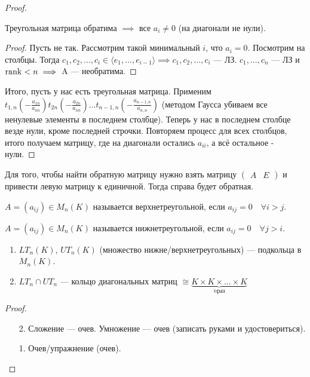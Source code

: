 \begin{proof}
    \begin{statement}
        Треугольная матрица обратима $\implies$ все  $a_i \neq 0$ (на диагонали не нули).
    \end{statement}
    \begin{proof}
        Пусть не так. Рассмотрим такой минимальный $i$, что  $a_i = 0$. Посмотрим на столбцы. Тогда  $c_1, c_2, \ldots, c_i \in \langle e_1, \ldots, e_{i-1} \rangle \implies c_1, c_2, \ldots, c_i$ --- ЛЗ. $c_1,\ldots,c_n$ --- ЛЗ и $\operatorname{rank} < n \implies$ A --- необратима.
    \end{proof}
    Итого, пусть у нас есть треугольная матрица. Применим $t_{1, n}(-\frac{a_{1n}}{a_{nn}})t_{2n}(-\frac{a_{2n}}{a_{nn}})\ldots t_{n-1,n}(-\frac{a_{n-1,n}}{a_{n,n}})$ (методом Гаусса убиваем все ненулевые элементы в последнем столбце). Теперь у нас в последнем столбце везде нули, кроме последней строчки. Повторяем процесс для всех столбцов, итого получаем матрицу, где на диагонали остались $a_{ii}$, а всё остальное - нули.
\end{proof}
\begin{statement}
    Для того, чтобы найти обратную матрицу нужно взять матрицу $\left(\begin{array}{c|c} A & E \end{array}\right)$ и привести левую матрицу к единичной. Тогда справа будет обратная.
\end{statement}
\begin{definition}
    $A = (a_{ij}) \in M_n(K)$ называется верхнетреугольной, если  $a_{ij} = 0 \quad \forall i > j$.

     $A = (a_{ij}) \in M_n(K)$ называется нижнетреугольной, если  $a_{ij} = 0 \quad \forall j > i$.
\end{definition}
\begin{statement}
    \begin{enumerate}
        \item $LT_n(K)$,  $UT_n(K)$ (множество нижне/верхнетреугольных) --- подкольца в  $M_n(K)$.
        \item $LT_n \cap UT_n$ --- кольцо диагональных матриц  $\cong \underbrace{K \times K \times \ldots \times K}_{n \text{раз}}$
    \end{enumerate}
\end{statement}
\begin{proof}
    \slashn
    \begin{enumerate}
        \item[2.] Сложение --- очев. Умножение --- очев (записать руками и удостовериться).
        \item [1.] Очев/упражнение (очев).
    \end{enumerate}
\end{proof}
